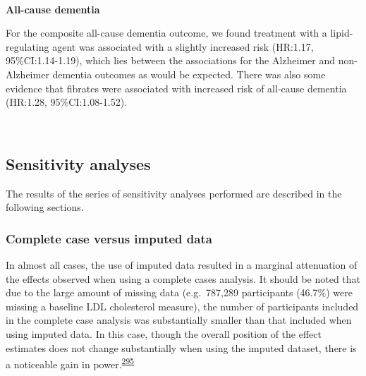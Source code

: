 \documentclass[a4paper, twoside]{templates/ociamthesis}
\begin{document}
~

\textbf{All-cause dementia}

For the composite all-cause dementia outcome, we found treatment with a lipid-regulating agent was associated with a slightly increased risk (HR:1.17, 95\%CI:1.14-1.19), which lies between the associations for the Alzheimer and non-Alzheimer dementia outcomes as would be expected. There was also some evidence that fibrates were associated with increased risk of all-cause dementia (HR:1.28, 95\%CI:1.08-1.52).

~

\hypertarget{sensitivity-analyses-1}{%
\subsection{Sensitivity analyses}\label{sensitivity-analyses-1}}

The results of the series of sensitivity analyses performed are described in the following sections.

\hypertarget{complete-case-versus-imputed-data}{%
\subsubsection{Complete case versus imputed data}\label{complete-case-versus-imputed-data}}

In almost all cases, the use of imputed data resulted in a marginal attenuation of the effects observed when using a complete cases analysis. It should be noted that due to the large amount of missing data (e.g.~787,289 participants (46.7\%) were missing a baseline LDL cholesterol measure), the number of participants included in the complete case analysis was substantially smaller than that included when using imputed data. In this case, though the overall position of the effect estimates does not change substantially when using the imputed dataset, there is a noticeable gain in power.\textsuperscript{\protect\hyperlink{ref-sterne2009}{295}}

~
\end{document}
